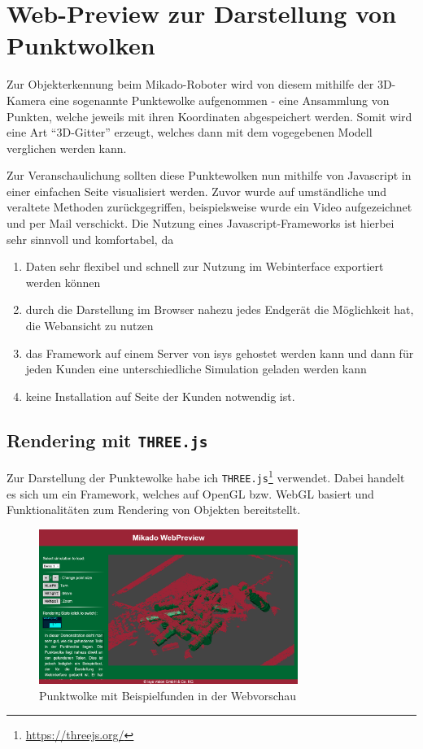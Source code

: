 \section{Web-Preview zur Darstellung von Punktwolken}
\label{sec:webtools-preview}

Zur Objekterkennung beim Mikado-Roboter wird von diesem mithilfe der 3D-Kamera eine
sogenannte Punktewolke aufgenommen - eine Ansammlung von Punkten, welche jeweils
mit ihren Koordinaten abgespeichert werden. Somit wird eine Art ``3D-Gitter'' erzeugt,
welches dann mit dem vogegebenen Modell verglichen werden kann.

Zur Veranschaulichung sollten diese Punktewolken nun mithilfe von Javascript in
einer einfachen Seite visualisiert werden. Zuvor wurde auf umständliche und veraltete Methoden zurückgegriffen, beispielsweise wurde ein Video aufgezeichnet und per Mail verschickt. Die Nutzung eines Javascript-Frameworks
ist hierbei sehr sinnvoll und komfortabel, da

\begin{enumerate}
	\item Daten sehr flexibel und schnell zur Nutzung im Webinterface exportiert werden können
	\item durch die Darstellung im Browser nahezu jedes Endgerät die Möglichkeit hat, die Webansicht zu nutzen
	\item das Framework auf einem Server von isys gehostet werden kann und dann für jeden Kunden eine unterschiedliche Simulation geladen werden kann
	\item keine Installation auf Seite der Kunden notwendig ist.
\end{enumerate}


\subsection{Rendering mit \texttt{THREE.js}}
\label{subsec:webtools-preview-rendering}

Zur Darstellung der Punktewolke habe ich \texttt{THREE.js}\footnote{\url{https://threejs.org/}}
verwendet. Dabei handelt es sich um ein Framework, welches auf OpenGL bzw. WebGL
basiert und Funktionalitäten zum Rendering von Objekten bereitstellt.

\begin{figure}[H]
	\centering
	\includegraphics[width=0.75\textwidth]{media/webpreview.png}
	\caption{Punktwolke mit Beispielfunden in der Webvorschau}
	\label{fig:webtools-preview-rendering}
\end{figure}

